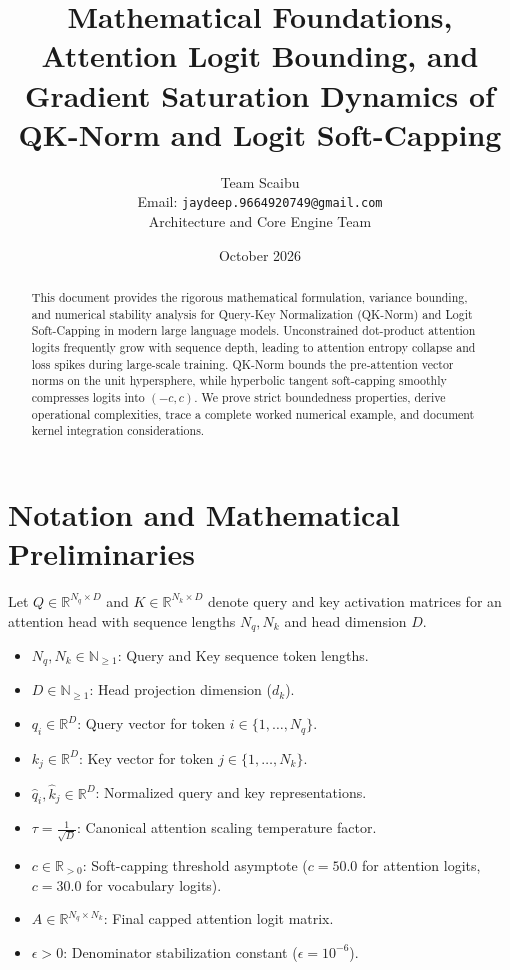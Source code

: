 \documentclass[11pt,a4paper]{article}
\title{\textbf{Mathematical Foundations, Attention Logit Bounding, and Gradient Saturation Dynamics of QK-Norm and Logit Soft-Capping}}
\author{Team Scaibu \\ \small Email: \texttt{jaydeep.9664920749@gmail.com} \\ \small Architecture and Core Engine Team}
\date{October 2026}
\theoremstyle{definition}
\begin{document}
\maketitle

\begin{abstract}
This document provides the rigorous mathematical formulation, variance bounding, and numerical stability analysis for Query-Key Normalization (QK-Norm) and Logit Soft-Capping in modern large language models. Unconstrained dot-product attention logits frequently grow with sequence depth, leading to attention entropy collapse and loss spikes during large-scale training. QK-Norm bounds the pre-attention vector norms on the unit hypersphere, while hyperbolic tangent soft-capping smoothly compresses logits into $(-c, c)$. We prove strict boundedness properties, derive operational complexities, trace a complete worked numerical example, and document kernel integration considerations.
\end{abstract}

\section{Notation and Mathematical Preliminaries}

Let $Q \in \mathbb{R}^{N_q \times D}$ and $K \in \mathbb{R}^{N_k \times D}$ denote query and key activation matrices for an attention head with sequence lengths $N_q, N_k$ and head dimension $D$.

\begin{itemize}
    \item $N_q, N_k \in \mathbb{N}_{\ge 1}$: Query and Key sequence token lengths.
    \item $D \in \mathbb{N}_{\ge 1}$: Head projection dimension ($d_k$).
    \item $q_i \in \mathbb{R}^D$: Query vector for token $i \in \{1, \dots, N_q\}$.
    \item $k_j \in \mathbb{R}^D$: Key vector for token $j \in \{1, \dots, N_k\}$.
    \item $\hat{q}_i, \hat{k}_j \in \mathbb{R}^D$: Normalized query and key representations.
    \item $\tau = \frac{1}{\sqrt{D}}$: Canonical attention scaling temperature factor.
    \item $c \in \mathbb{R}_{> 0}$: Soft-capping threshold asymptote ($c = 50.0$ for attention logits, $c = 30.0$ for vocabulary logits).
    \item $A \in \mathbb{R}^{N_q \times N_k}$: Final capped attention logit matrix.
    \item $\epsilon > 0$: Denominator stabilization constant ($\epsilon = 10^{-6}$).
\end{itemize}
\end{document}
